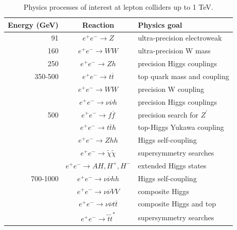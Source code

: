 \begin{table}[b]
\centering
	\begin{tabular}{ r  c  l }
	\hline \hline
	\textbf{Energy (GeV)} & \textbf{Reaction} & \textbf{Physics goal} \\ \hline
	 91 & $e^+ e^- \rightarrow Z$ & ultra-precision electroweak \\ \hline
	 160 & $e^+ e^- \rightarrow WW$ & ultra-precision W mass \\ \hline
	 250 & $e^+ e^- \rightarrow Zh$ & precision Higgs couplings \\ \hline
	 350-500 & $e^+ e^- \rightarrow t\overline{t}$ & top quark mass and coupling \\
	   & $e^+ e^- \rightarrow WW$ & precision W coupling \\
	   & $e^+ e^- \rightarrow \nu \overline{\nu} h$ & precision Higgs couplings \\ \hline
	 500 & $e^+ e^- \rightarrow f \overline{f}$ & precision search for $Z^\prime$ \\
	   & $e^+ e^- \rightarrow t \overline{t}h$ & top-Higgs Yukawa coupling \\
	   & $e^+ e^- \rightarrow Zhh$ & Higgs self-coupling \\
	   & $e^+ e^- \rightarrow \widetilde{\chi} \widetilde{\chi}$ & supersymmetry searches \\
	   & $e^+ e^- \rightarrow AH, H^+, H^-$ & extended Higgs states \\ \hline
	 700-1000 & $e^+ e^- \rightarrow \nu \overline{\nu} hh$ & Higgs self-coupling \\
	   & $e^+ e^- \rightarrow \nu \overline{\nu} VV$ & composite Higgs \\
	   & $e^+ e^- \rightarrow  \nu \overline{\nu} t \overline{t}$ & composite Higgs and top \\
	   & $e^+ e^- \rightarrow \tilde{t} \tilde{t}^*$ & supersymmetry searches \\ \hline \hline
	\end{tabular}
	\caption{Physics processes of interest at lepton colliders up to 1 TeV.}
	\label{table:colliders/physics-goals}
\end{table}

